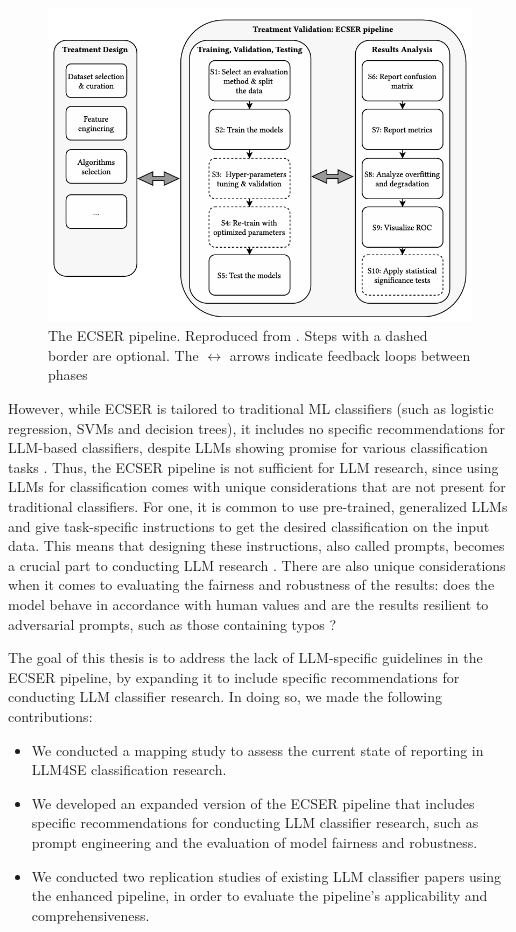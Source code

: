 \documentclass[a4paper]{article}
\begin{document}
\begin{figure}[h]
    \centering
    \includegraphics[width=0.8\linewidth]{figures/ECSER.png}
    \caption{The ECSER pipeline. Reproduced from \textcite{Dellanna2022}. Steps with a dashed border are optional. The $\leftrightarrow$ arrows indicate feedback loops between phases}
    \label{fig:ECSER}
\end{figure}


However, while ECSER is tailored to traditional ML classifiers (such as logistic regression, SVMs and decision trees), it includes no specific recommendations for LLM-based classifiers, despite LLMs showing promise for various classification tasks \cite{Guo2024health,fields2024}. Thus, the ECSER pipeline is not sufficient for LLM research, since using LLMs for classification comes with unique considerations that are not present for traditional classifiers. For one, it is common to use pre-trained, generalized LLMs and give task-specific instructions to get the desired classification on the input data. This means that designing these instructions, also called prompts, becomes a crucial part to conducting LLM research \cite{Marvin2024}. There are also unique considerations when it comes to evaluating the fairness and robustness of the results: does the model behave in accordance with human values and are the results resilient to adversarial prompts, such as those containing typos \cite{Woodworth2017,zhu2024}?


The goal of this thesis is to address the lack of LLM-specific guidelines in the ECSER pipeline, by expanding it to include specific recommendations for conducting LLM classifier research. In doing so, we made the following contributions:
\begin{itemize}
    \item We conducted a mapping study to assess the current state of reporting in LLM4SE classification research.
    \item We developed an expanded version of the ECSER pipeline that includes specific recommendations for conducting LLM classifier research, such as prompt engineering and the evaluation of model fairness and robustness.
    \item We conducted two replication studies of existing LLM classifier papers using the enhanced pipeline, in order to evaluate the pipeline's applicability and comprehensiveness.
\end{itemize}
\end{document}

